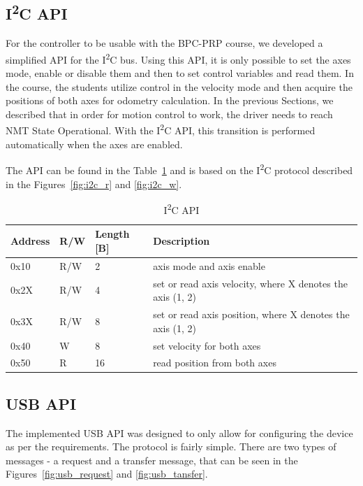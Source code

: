 \subsection{I\textsuperscript{2}C API}
For the controller to be usable with the BPC-PRP course, we developed a simplified API for the I\textsuperscript{2}C bus.
Using this API, it is only possible to set the axes mode, enable or disable them and then to set control variables and read them.
In the course, the students utilize control in the velocity mode and then acquire the positions of both axes for odometry calculation.
In the previous Sections, we described that in order for motion control to work, the driver needs to reach NMT State Operational.
With the I\textsuperscript{2}C API, this transition is performed automatically when the axes are enabled.

The API can be found in the Table~\ref{tab:i2c_api} and is based on the I\textsuperscript{2}C protocol described in the Figures~\ref{fig:i2c_r} and \ref{fig:i2c_w}.

\begin{table}[H]
    \centering
    \begin{tabular}{ |p{3cm}|p{2cm}|p{2cm}|p{6cm}| }
        \hline
        Address & R/W & Length [B] & Description \\
        \hline
        \hline
        0x10 & R/W & 2 & axis mode and axis enable \\
        \hline
        0x2X & R/W & 4 & set or read axis velocity, where X denotes the axis (1, 2) \\
        \hline
        0x3X & R/W & 8 & set or read axis position, where X denotes the axis (1, 2) \\
        \hline
        0x40 & W & 8 & set velocity for both axes \\
        \hline
        0x50 & R & 16 & read position from both axes \\
        \hline
    \end{tabular}
    \caption{I\textsuperscript{2}C API}
    \label{tab:i2c_api}
\end{table}

\subsection{USB API}
The implemented USB API was designed to only allow for configuring the device as per the requirements.
The protocol is fairly simple.
There are two types of messages - a request and a transfer message, that can be seen in the Figures~\ref{fig:usb_request} and \ref{fig:usb_tansfer}.

